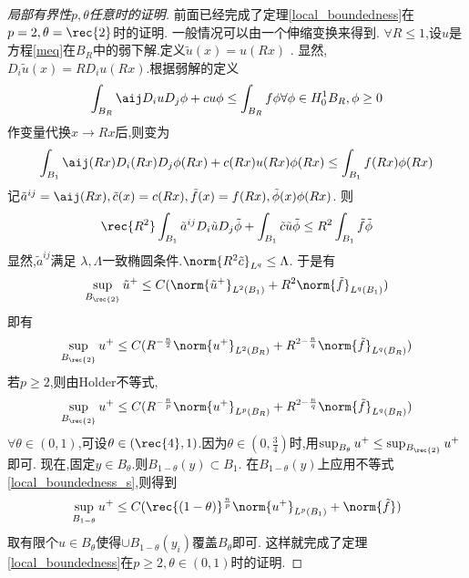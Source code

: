 \begin{proof}[局部有界性$p,\theta$任意时的证明]
    前面已经完成了定理\eqref{local_boundedness}在$p=2,\theta=\rec{2}$时的证明. 一般情况可以由一个伸缩变换来得到. $\forall R \le 1$,设$u$是方程\eqref{meq}在$B_R$中的弱下解.定义$\tilde{u}(x)= u(Rx)$ . 显然, $D_i \tilde{u}(x) = RD_iu(Rx)$.根据弱解的定义 
    \begin{equation}
        \int_{B_R} \aij D_iu D_j\phi + cu\phi \le \int_{B_R}f\phi \forall \phi \in H^1_0{B_R}, \phi \ge 0
    \end{equation}
    作变量代换$x\to Rx$后,则变为
    \begin{equation}
        \int_{B_1} \aij(Rx) D_i(Rx)D_j\phi(Rx) + c(Rx)u(Rx)\phi(Rx) \le \int_{B_1}f(Rx)\phi(Rx)
    \end{equation}
    记$\tilde{a}^{ij}=\aij(Rx), \tilde{c}(x)=c(Rx), \tilde{f}(x)=f(Rx),\tilde{\phi}(x)\phi(Rx)$. 则
    \begin{equation}
        \rec{R^2}\int_{B_1}\tilde{a}^{ij}D_i\tilde{u}D_j\tilde{\phi}+\int_{B_1}\tilde{c}\tilde{u}\tilde{\phi} \le R^2\int_{B_1}\tilde{f}\tilde{\phi}
    \end{equation}
    显然,$\tilde{a}^{ij}$满足 $\lambda,\Lambda$一致椭圆条件.$\norm{R^2\tilde{c}}_{L^q} \le \Lambda$. 于是有 
    \begin{equation}
        \sup_{B_\rec{2}}\tilde{u}^+ \le C(\norm{\tilde{u}^+}_{L^2(B_1)}+R^2\norm{\tilde{f}}_{L^q(B_1)})
    \end{equation}
    即有
    \begin{equation}
        \sup_{B_\rec{2}}{u}^+ \le C(R^{-\frac{n}{2}}\norm{{u}^+}_{L^2(B_R)}+R^{2-\frac{n}{q}}\norm{\tilde{f}}_{L^q(B_R)})
    \end{equation}
    若$p \ge 2$,则由Holder不等式,
    \begin{equation} \label{local_boundedness_s}
        \sup_{B_\rec{2}}{u}^+ \le C(R^{-\frac{n}{p}}\norm{{u}^+}_{L^p(B_R)}+R^{2-\frac{n}{q}}\norm{\tilde{f}}_{L^q(B_R)})
    \end{equation}
    $\forall \theta \in (0,1)$,可设$\theta \in (\rec{4},1)$.因为$\theta \in (0,\frac{3}{4})$时,用$\sup_{B_\theta}u^+ \le \sup_{B_\rec{2}}u^+$即可. 现在,固定$y \in B_\theta$.则$B_{1-\theta}(y) \subset B_1$. 在$B_{1-\theta}(y)$上应用不等式\eqref{local_boundedness_s},则得到
    \begin{equation}
        \sup_{B_{1-\theta}}{u}^+ \le C(\rec{{(1-\theta)}}^{\frac{n}{p}}\norm{{u}^+}_{L^p(B_1)}+\norm{\tilde{f}})
    \end{equation}
    取有限个$u\in B_{\theta}$使得$\cup B_{1-\theta}(y_i)$覆盖$B_\theta$即可.  这样就完成了定理\eqref{local_boundedness}在$p \ge 2, \theta \in (0,1)$时的证明.

\end{proof}
